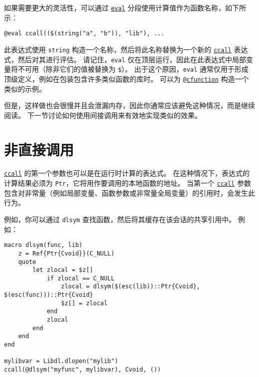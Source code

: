 如果需要更大的灵活性，可以通过 \hyperlink{7507639810592563424}{\texttt{eval}} 分段使用计算值作为函数名称，如下所示：




\begin{lstlisting}
@eval ccall(($(string("a", "b")), "lib"), ...
\end{lstlisting}



此表达式使用 \texttt{string} 构造一个名称，然后将此名称替换为一个新的 \hyperlink{14245046751182637566}{\texttt{ccall}} 表达式，然后对其进行评估。 请记住，\texttt{eval} 仅在顶层运行，因此在此表达式中局部变量将不可用（除非它们的值被替换为 \texttt{\$}）。 出于这个原因，\texttt{eval} 通常仅用于形成顶级定义，例如在包装包含许多类似函数的库时。 可以为 \hyperlink{11617107520401351255}{\texttt{@cfunction}} 构造一个类似的示例。



但是，这样做也会很慢并且会泄漏内存，因此你通常应该避免这种情况，而是继续阅读。 下一节讨论如何使用间接调用来有效地实现类似的效果。



\hypertarget{18148794268039727850}{}


\section{非直接调用}



\hyperlink{14245046751182637566}{\texttt{ccall}} 的第一个参数也可以是在运行时计算的表达式。 在这种情况下，表达式的计算结果必须为 \texttt{Ptr}，它将用作要调用的本地函数的地址。 当第一个 \hyperlink{14245046751182637566}{\texttt{ccall}} 参数包含对非常量（例如局部变量、函数参数或非常量全局变量）的引用时，会发生此行为。



例如，你可以通过 \texttt{dlsym} 查找函数，然后将其缓存在该会话的共享引用中。 例如：




\begin{verbatim}
macro dlsym(func, lib)
    z = Ref{Ptr{Cvoid}}(C_NULL)
    quote
        let zlocal = $z[]
            if zlocal == C_NULL
                zlocal = dlsym($(esc(lib))::Ptr{Cvoid}, $(esc(func)))::Ptr{Cvoid}
                $z[] = zlocal
            end
            zlocal
        end
    end
end

mylibvar = Libdl.dlopen("mylib")
ccall(@dlsym("myfunc", mylibvar), Cvoid, ())
\end{verbatim}



